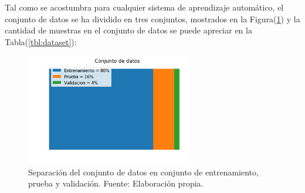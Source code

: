    Tal como se acostumbra para cualquier sistema de aprendizaje automático, el conjunto de datos se 
    ha dividido en tres conjuntos, mostrados en la Figura(\ref{fig:dataset1}) y la cantidad de muestras en el conjunto 
    de datos se puede apreciar en la Tabla(\ref{tbl:dataset}):
    
    \begin{table}[!h]
        \centering
        \caption{Cantidad de muestras en los conjuntos de datos}
        \label{tbl:dataset}
    \end{table}

    \begin{figure}[!h] 
        \centering
        \includegraphics[width=0.65\textwidth]{img/dataset1}
        \caption[Separación del conjunto de datos]{Separación del conjunto de datos en conjunto de entrenamiento, prueba y validación. Fuente: Elaboración propia. }
        \label{fig:dataset1}
    \end{figure}
    

